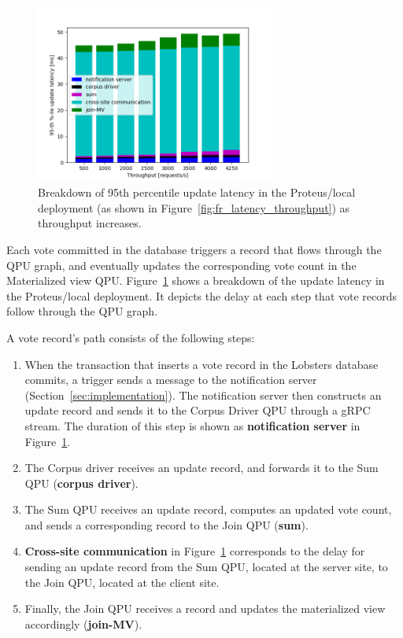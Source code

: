 \begin{figure}[H]
\centering
  \includegraphics[width=0.7\textwidth]{./figures/evaluation/fr_latency_throughput_breakdown.png}
  \caption{Breakdown of 95th percentile update latency in the Proteus/local deployment
  (as shown in Figure~\ref{fig:fr_latency_throughput}) as throughput increases.}
  \label{fig:fr_latency_throughput_breakdown}
\end{figure}

Each vote committed in the database triggers a record that flows through the QPU graph, and eventually updates the corresponding
vote count in the Materialized view QPU.
Figure~\ref{fig:fr_latency_throughput_breakdown} shows a breakdown of the update latency in the Proteus/local
deployment.
It depicts the delay at each step that vote records follow through the QPU graph.

A vote record's path consists of the following steps:
\begin{enumerate}
  \item When the transaction that inserts a vote record in the Lobsters database commits,
  a trigger sends a message to the notification server (Section~\ref{sec:implementation}).
  The notification server then constructs an update record and sends it to the Corpus Driver QPU through a gRPC stream.
  The duration of this step is shown as \textbf{notification server} in Figure~\ref{fig:fr_latency_throughput_breakdown}.

  \item The Corpus driver receives an update record, and forwards it to the Sum QPU (\textbf{corpus driver}).

  \item The Sum QPU receives an update record, computes an updated vote count,
  and sends a corresponding record to the Join QPU (\textbf{sum}).

  \item \textbf{Cross-site communication} in Figure~\ref{fig:fr_latency_throughput_breakdown} corresponds to the delay for
  sending an update record from the Sum QPU, located at the server site, to the Join QPU, located at the client site.

  \item Finally, the Join QPU receives a record and updates the materialized view accordingly (\textbf{join-MV}).

\end{enumerate}

